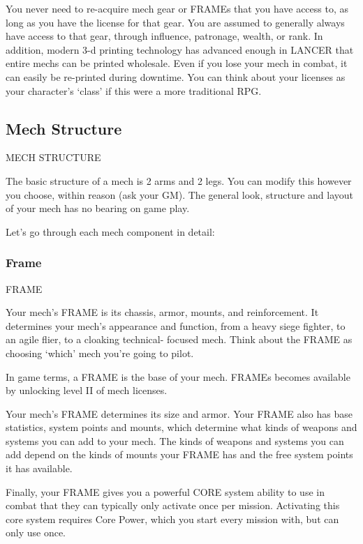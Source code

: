 You never need to re-acquire mech gear or FRAMEs that you have access to, as long as you
have the license for that gear. You are assumed to generally always have access to that gear,
through influence, patronage, wealth, or rank. In addition, modern 3-d printing technology has
advanced enough in LANCER that entire mechs can be printed wholesale. Even if you lose your
mech in combat, it can easily be re-printed during downtime. You can think about your licenses
as your character’s ‘class’ if this were a more traditional RPG.

\subsection{Mech Structure}
                                        MECH STRUCTURE




The basic structure of a mech is 2 arms and 2 legs. You can modify this however you choose,
within reason (ask your GM). The general look, structure and layout of your mech has no
bearing on game play.


Let’s go through each mech component in detail:

\subsubsection{Frame}
                                                 FRAME

Your mech’s FRAME is its chassis, armor, mounts, and reinforcement. It determines your mech’s
appearance and function, from a heavy siege fighter, to an agile flier, to a cloaking technical-
focused mech. Think about the FRAME as choosing ‘which’ mech you’re going to pilot.


In game terms, a FRAME is the base of your mech. FRAMEs becomes available by unlocking
level II of mech licenses.


Your mech’s FRAME determines its size and armor. Your FRAME also has base statistics,
system points and mounts, which determine what kinds of weapons and systems you can add
to your mech. The kinds of weapons and systems you can add depend on the kinds of mounts
your FRAME has and the free system points it has available.


Finally, your FRAME gives you a powerful CORE system ability to use in combat that they can
typically only activate once per mission. Activating this core system requires Core Power, which
you start every mission with, but can only use once.

